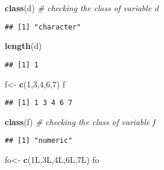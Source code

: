 \documentclass[
]{article}
\newenvironment{Shaded}{\begin{snugshade}}{\end{snugshade}}
\newcommand{\CommentTok}[1]{\textcolor[rgb]{0.56,0.35,0.01}{\textit{#1}}}
\newcommand{\DataTypeTok}[1]{\textcolor[rgb]{0.13,0.29,0.53}{#1}}
\newcommand{\DecValTok}[1]{\textcolor[rgb]{0.00,0.00,0.81}{#1}}
\newcommand{\FunctionTok}[1]{\textcolor[rgb]{0.13,0.29,0.53}{\textbf{#1}}}
\newcommand{\NormalTok}[1]{#1}
\newcommand{\OtherTok}[1]{\textcolor[rgb]{0.56,0.35,0.01}{#1}}
\begin{document}
\begin{Shaded}
\begin{Highlighting}[]
\FunctionTok{class}\NormalTok{(d) }\CommentTok{\# checking the class of variable d}
\end{Highlighting}
\end{Shaded}

\begin{verbatim}
## [1] "character"
\end{verbatim}

\begin{Shaded}
\begin{Highlighting}[]
\FunctionTok{length}\NormalTok{(d)}
\end{Highlighting}
\end{Shaded}

\begin{verbatim}
## [1] 1
\end{verbatim}

\begin{Shaded}
\begin{Highlighting}[]
\NormalTok{f}\OtherTok{\textless{}{-}} \FunctionTok{c}\NormalTok{(}\DecValTok{1}\NormalTok{,}\DecValTok{3}\NormalTok{,}\DecValTok{4}\NormalTok{,}\DecValTok{6}\NormalTok{,}\DecValTok{7}\NormalTok{) }
\NormalTok{f}
\end{Highlighting}
\end{Shaded}

\begin{verbatim}
## [1] 1 3 4 6 7
\end{verbatim}

\begin{Shaded}
\begin{Highlighting}[]
\FunctionTok{class}\NormalTok{(f) }\CommentTok{\# checking the class of variable f}
\end{Highlighting}
\end{Shaded}

\begin{verbatim}
## [1] "numeric"
\end{verbatim}

\begin{Shaded}
\begin{Highlighting}[]
\NormalTok{fo}\OtherTok{\textless{}{-}} \FunctionTok{c}\NormalTok{(}\DecValTok{1}\DataTypeTok{L}\NormalTok{,}\DecValTok{3}\DataTypeTok{L}\NormalTok{,}\DecValTok{4}\DataTypeTok{L}\NormalTok{,}\DecValTok{6}\DataTypeTok{L}\NormalTok{,}\DecValTok{7}\DataTypeTok{L}\NormalTok{)}
\NormalTok{fo}
\end{Highlighting}
\end{Shaded}
\end{document}
